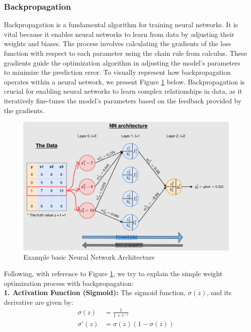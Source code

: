 \subsubsection*{Backpropagation}

Backpropagation is a fundamental algorithm for training neural networks. It is vital because it enables neural networks to learn from data by adjusting their weights and biases. The process involves calculating the gradients of the loss function with respect to each parameter using the chain rule from calculus. These gradients guide the optimization algorithm in adjusting the model's parameters to minimize the prediction error. To visually represent how backpropagation operates within a neural network, we present Figure \ref{fig:backrop} below. Backpropagation is crucial for enabling neural networks to learn complex relationships in data, as it iteratively fine-tunes the model's parameters based on the feedback provided by the gradients.

\begin{figure}[htbp]
    \centerline{\includegraphics[scale=.29]{figures/backpropagation.png}}
    \caption{Example basic Neural Network Architecture~\cite{koech2022backpropagation} }
    \label{fig:backrop}
    \end{figure}

Following, with reference to Figure \ref{fig:backrop}, we try to explain the simple weight optimization process with backpropagation:\\

\textbf{1. Activation Function (Sigmoid):}
The sigmoid function, \( \sigma(z) \), and its derivative are given by:
\begin{align*}
\sigma(z) &= \frac{1}{1 + e^{-z}} \\
\sigma'(z) &= \sigma(z)(1 - \sigma(z))
\end{align*}

